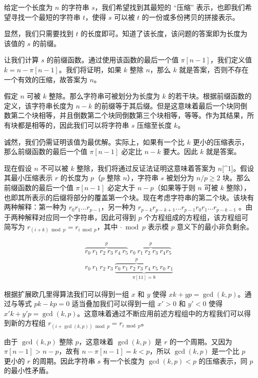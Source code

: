 给定一个长度为 $n$ 的字符串 $s$，我们希望找到其最短的 “压缩” 表示，也即我们希望寻找一个最短的字符串 $t$，使得 $s$ 可以被 $t$ 的一份或多份拷贝的拼接表示。

显然，我们只需要找到 $t$ 的长度即可。知道了该长度，该问题的答案即为长度为该值的 $s$ 的前缀。

让我们计算 $s$ 的前缀函数。通过使用该函数的最后一个值 $\pi[n - 1]$，我们定义值 $k = n - \pi[n - 1]$。我们将证明，如果 $k$ 整除 $n$，那么 $k$ 就是答案，否则不存在一个有效的压缩，故答案为 $n$。

假定 $n$ 可被 $k$ 整除。那么字符串可被划分为长度为 $k$ 的若干块。根据前缀函数的定义，该字符串长度为 $n - k$ 的前缀等于其后缀。但是这意味着最后一个块同倒数第二个块相等，并且倒数第二个块同倒数第三个块相等，等等。作为其结果，所有块都是相等的，因此我们可以将字符串 $s$ 压缩至长度 $k$。

诚然，我们仍需证明该值为最优解。实际上，如果有一个比 $k$ 更小的压缩表示，那么前缀函数的最后一个值 $\pi[n - 1]$ 必定比 $n - k$ 要大。因此 $k$ 就是答案。

现在假设 $n$ 不可以被 $k$ 整除，我们将通过反证法证明这意味着答案为 $n$[^1]。假设其最小压缩表示 $r$ 的长度为 $p$（$p$ 整除 $n$），字符串 $s$ 被划分为 $n / p \ge 2$ 块。那么前缀函数的最后一个值 $\pi[n - 1]$ 必定大于 $n - p$（如果等于则 $n$ 可被 $k$ 整除），也即其所表示的后缀将部分的覆盖第一个块。现在考虑字符串的第二个块。该块有两种解释：第一种为 $r_0 r_1 \dots r_{p - 1}$，另一种为 $r_{p - k} r_{p - k + 1} \dots r_{p - 1} r_0 r_1 \dots r_{p - k - 1}$ 。由于两种解释对应同一个字符串，因此可得到 $p$ 个方程组成的方程组，该方程组可简写为 $r_{(i + k) \bmod p} = r_{i \bmod p}$，其中 $\cdot \bmod p$ 表示模 $p$ 意义下的最小非负剩余。

$$
\begin{gather}
\overbrace{r_0 ~ r_1 ~ r_2 ~ r_3 ~ r_4 ~ r_5}^p ~ \overbrace{r_0 ~ r_1 ~ r_2 ~ r_3 ~ r_4 r_5}^p \\
r_0 ~ r_1 ~ r_2 ~ r_3 ~ \underbrace{\overbrace{r_0 ~ r_1 ~ r_2 ~ r_3 ~ r_4 ~ r_5}^p ~ r_0 ~ r_1}_{\pi[11] = 8}
\end{gather}
$$

根据扩展欧几里得算法我们可以得到一组 $x$ 和 $y$ 使得 $xk + yp = \gcd(k, p)$。通过与等式 $pk - kp = 0$ 适当叠加我们可以得到一组 $x' > 0$ 和 $y' < 0$ 使得 $x'k + y'p = \gcd(k, p)$。这意味着通过不断应用前述方程组中的方程我们可以得到新的方程组 $r_{(i + \gcd(k, p)) \bmod p} = r_{i \bmod p}$。

由于 $\gcd(k, p)$ 整除 $p$，这意味着 $\gcd(k, p)$ 是 $r$ 的一个周期。又因为 $\pi[n - 1] > n - p$，故有 $n - \pi[n - 1] = k < p$，所以 $\gcd(k, p)$ 是一个比 $p$ 更小的 $r$ 的周期。因此字符串 $s$ 有一个长度为 $\gcd(k, p) < p$ 的压缩表示，同 $p$ 的最小性矛盾。

